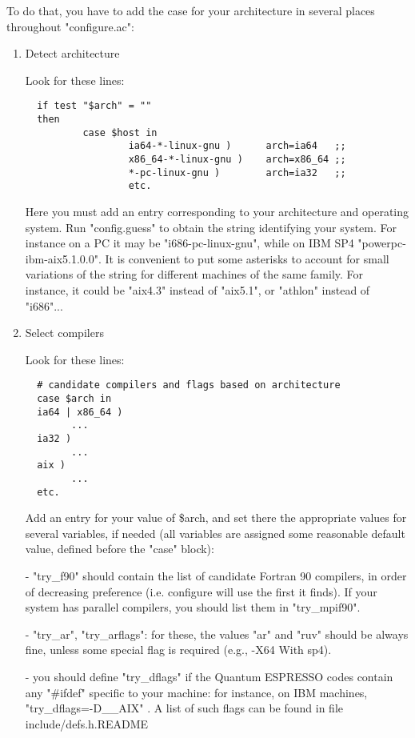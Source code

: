 \documentclass[12pt,a4paper]{article}
\begin{document}
To do that, you have to add the case for your architecture in several
places throughout "configure.ac":
\begin{enumerate}
\item Detect architecture

Look for these lines:
\begin{verbatim}
  if test "$arch" = ""
  then
          case $host in
                  ia64-*-linux-gnu )      arch=ia64   ;;
                  x86_64-*-linux-gnu )    arch=x86_64 ;;
                  *-pc-linux-gnu )        arch=ia32   ;;
                  etc.
\end{verbatim}
Here you must add an entry corresponding to your architecture and
operating system.  Run "config.guess" to obtain the string identifying
your system.
For instance on a PC it may be "i686-pc-linux-gnu", while on IBM SP4
"powerpc-ibm-aix5.1.0.0".  It is convenient to put some asterisks to
account for small variations of the string for different machines of
the same family.  For instance, it could be "aix4.3" instead of
"aix5.1", or "athlon" instead of "i686"...

\item  Select compilers

Look for these lines:

\begin{verbatim}
  # candidate compilers and flags based on architecture
  case $arch in
  ia64 | x86_64 )
        ...
  ia32 )
        ...
  aix )
        ...
  etc.
\end{verbatim}

Add an entry for your value of \$arch, and set there the appropriate
values for several variables, if needed (all variables are assigned
some reasonable default value, defined before the "case" block):

- "try\_f90" should contain the list of candidate Fortran 90 compilers,
in order of decreasing preference (i.e. configure will use the first
it finds).  If your system has parallel compilers, you should list
them in "try\_mpif90".

- "try\_ar", "try\_arflags": for these, the values "ar" and "ruv" should
be always fine, unless some special flag is required (e.g., -X64
With sp4).  

- you should define "try\_dflags" if the Quantum ESPRESSO codes contain any
"\#ifdef" specific to your machine: for instance, on IBM machines,
"try\_dflags=-D\_\_AIX" . A list of such flags can be found in file 
include/defs.h.README


\end{enumerate}
\end{document}
